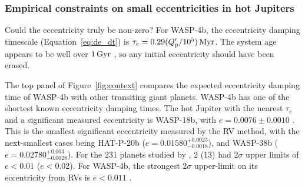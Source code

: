 \documentclass[12pt,twocolumn,tighten]{aastex62}
\begin{document}
\subsubsection{Empirical constraints on small eccentricities in hot
Jupiters}

Could the eccentricity truly be non-zero?  For WASP-4b, the
eccentricity damping timescale (Equation~\ref{eq:de_dt}) is $\tau_e =
0.29 (Q_{\rm p}'/10^5) \, {\rm Myr}$.  The system age appears to be
well over $1\,{\rm Gyr}$ \citep{winn_transit_2009}, so any initial
eccentricity should have been erased.

The top panel of Figure~\ref{fig:context} compares the expected
eccentricity damping time of WASP-4b with other transiting giant
planets.  WASP-4b has one of the shortest known eccentricity damping
times.  The hot Jupiter with the nearest $\tau_e$ and a significant
measured eccentricity is WASP-18b, with $e = 0.0076 \pm 0.0010$
\citep{triaud_spin-orbit_2010,bonomo_gaps_2017}.  This is the smallest
significant eccentricity measured by the RV method, with the
next-smallest cases being HAT-P-20b ($e =
0.01580^{+0.0023}_{-0.0018}$), and WASP-38b ($e =
0.02780^{+0.003}_{-0.0028}$).  For the 231 planets studied by
\citet{bonomo_gaps_2017}, 2 (13) had $2\sigma$ upper limits of $e <
0.01$ ($e<0.02$).  For WASP-4b, the strongest $2\sigma$ upper-limit on
its eccentricity from RVs is $e<0.011$
\citep{husnoo_observational_2012,bonomo_gaps_2017}.  
\end{document}
